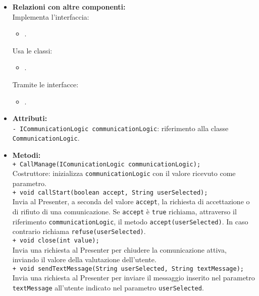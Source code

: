 {\begin{sloppypar}
{{\begin{itemize}
			\item[]  \textbf{Relazioni con altre componenti:} \\
				Implementa l'interfaccia:
				\begin{itemize}
					\item {}.
				\end{itemize}
				Usa le classi:
				\begin{itemize}
					\item {}.
				\end{itemize}
				Tramite le interfacce:
				\begin{itemize}
					\item {}.\\
				\end{itemize}
					
			\item[] \textbf{Attributi:}\\
				\texttt{- ICommunicationLogic communicationLogic}: riferimento alla classe \texttt{CommunicationLogic}.\\
				
			\item[] \textbf{Metodi:}\\
				\texttt{+ CallManage(IComunicationLogic communicationLogic);}\\
				Costruttore: inizializza \texttt{communicationLogic} con il valore ricevuto come parametro.\\

				\texttt{+ void callStart(boolean accept, String userSelected);}\\
				Invia al Presenter, a seconda del valore \texttt{accept}, la richiesta di accettazione o di rifiuto di una 
				comunicazione. Se \texttt{accept} è \texttt{true} richiama, attraverso il riferimento \texttt{communicationLogic}, il metodo \texttt{accept(userSelected)}. In caso contrario richiama \texttt{refuse(userSelected)}.\\

				\texttt{+ void close(int value);}\\
				Invia una richiesta al Presenter per chiudere la comunicazione attiva, inviando il valore della 
				valutazione dell'utente.\\
				
				\texttt{+ void sendTextMessage(String userSelected, String textMessage);}\\
				Invia una richiesta al Presenter per inviare il messaggio inserito nel parametro \texttt{textMessage} all'utente indicato nel parametro \texttt{userSelected}.\\
				

\end{itemize}}}
\end{sloppypar}}
